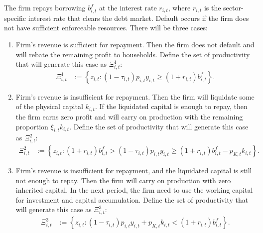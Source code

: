 \documentclass[12pt]{article}
\numberwithin{equation}{section}
\begin{document}
The firm repays borrowing $b^f_{i,t}$ at the interest rate $r_{i,t}$, where $r_{i,t}$ is the sector-specific interest rate that clears the debt market. Default occurs if the firm does not have sufficient enforceable resources. There will be three cases:
\begin{enumerate}
    \item Firm's revenue is sufficient for repayment. Then the firm does not default and will rebate the remaining profit to households. Define the set of productivity that will generate this case as $\Xi^1_{i,t}$:
    \begin{align*}
        \Xi^1_{i,t} &:= \left\{z_{i,t}: (1-\tau_{i,t})p_{i,t} y_{i,t} \geq (1+r_{i,t})b^f_{i,t}\right\}.
    \end{align*}
    \item Firm's revenue is insufficient for repayment. Then the firm will liquidate some of the physical capital $k_{i,t}$. If the liquidated capital is enough to repay, then the firm earns zero profit and will carry on production with the remaining proportion $\xi_{i,t} k_{i,t}$. Define the set of productivity that will generate this case as $\Xi^2_{i,t}$:
    \begin{align*}
        \Xi^2_{i,t} &:= \left\{z_{i,t}: (1+r_{i,t})b^f_{i,t} > (1-\tau_{i,t})p_{i,t} y_{i,t} \geq (1+r_{i,t})b^f_{i,t} - p_{K,t} k_{i,t}\right\}.
    \end{align*}
    \item Firm's revenue is insufficient for repayment, and the liquidated capital is still not enough to repay. Then the firm will carry on production with zero inherited capital. In the next period, the firm need to use the working capital for investment and capital accumulation. Define the set of productivity that will generate this case as $\Xi^3_{i,t}$:
    \begin{align*}
        \Xi^3_{i,t} &:= \left\{z_{i,t}: (1-\tau_{i,t})p_{i,t} y_{i,t} + p_{K,t} k_{i,t} < (1+r_{i,t})b^f_{i,t}\right\}.
    \end{align*}
\end{enumerate}
\end{document}
